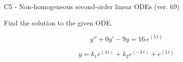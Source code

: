 \begin{exercise}
  \begin{exerciseTitle}C5 - Non-homogeneous second-order linear ODEs (ver. 69)\end{exerciseTitle}
  \begin{exerciseStatement}
    
Find the solution to the given ODE.

    
\[y''+0y'-9y = 16 \, e^{\left(5 \, t\right)}\]

  \end{exerciseStatement}
  \begin{exerciseAnswer}
    
\[y= k_{1} e^{\left(3 \, t\right)} + k_{2} e^{\left(-3 \, t\right)} + e^{\left(5 \, t\right)}\]

  \end{exerciseAnswer}
\end{exercise}